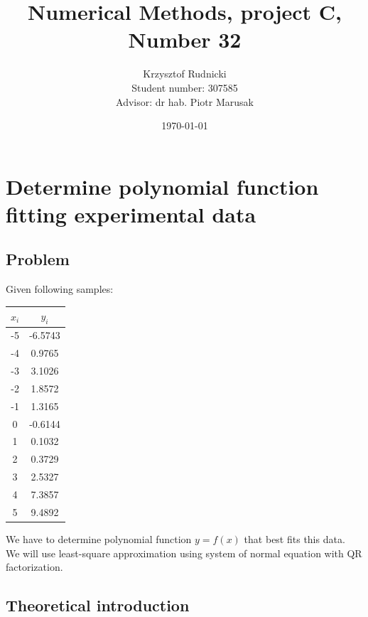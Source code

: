 \documentclass[12pt]{report}
\title{Numerical Methods, project C, Number 32}
\author{Krzysztof Rudnicki\\ Student number: 307585 \\ Advisor: dr hab. Piotr Marusak}
\date{\today}
\begin{document}
\maketitle
\tableofcontents

\chapter{Determine polynomial function fitting experimental data}
\section{Problem}
Given following samples:
\begin{center}
  \begin{tabular}{| c | c |}
\hline
$x_i$ & $y_i$ \\
\hline
-5 & -6.5743\\
\hline
-4 & 0.9765\\
\hline
-3 & 3.1026\\
\hline
-2 & 1.8572 \\
\hline
-1 & 1.3165 \\
\hline
0 & -0.6144 \\
\hline
1 & 0.1032 \\
\hline
2 & 0.3729 \\
\hline
3 & 2.5327 \\
\hline
4 & 7.3857 \\
\hline
5 & 9.4892 \\
\hline

\end{tabular}
\end{center}

We have to determine polynomial function $ y  = f(x) $ that best fits this data. \\
We will use least-square approximation using system of normal equation with QR factorization.

\section{Theoretical introduction}
\end{document}
